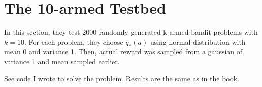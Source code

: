 \documentclass{article}
\begin{document}
\section{The 10-armed Testbed}

In this section, they test 2000 randomly generated k-armed bandit problems with $k=10$. For each problem, they choose $q_*(a)$ using normal distribution with mean 0 and variance 1. Then, actual reward was sampled from a gaussian of variance 1 and mean sampled earlier.

See code I wrote to solve the problem. Results are the same as in the book.
\end{document}
